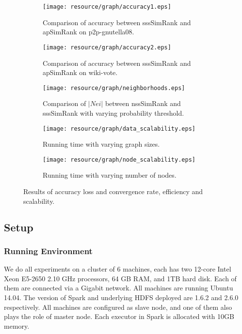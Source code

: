 \documentclass[conference]{IEEEtran}
\theoremstyle{definition}
\theoremstyle{definition}
\begin{document}
\begin{figure*}[t]
\centering
\begin{subfigure}[b]{0.32\textwidth}
	\center
	\texttt{[image: resource/graph/accuracy1.eps]}
	\caption{Comparison of accuracy   between sssSimRank and apSimRank on p2p-gnutella08.}
	\label{fig:three:a}
\end{subfigure}
\begin{subfigure}[b]{0.32\textwidth}
	\centering
	\texttt{[image: resource/graph/accuracy2.eps]}
	\caption{Comparison of accuracy   between sssSimRank and apSimRank on wiki-vote.}
	\label{fig:three:b}
\end{subfigure}
\begin{subfigure}[b]{0.32\textwidth}
	\centering
	\texttt{[image: resource/graph/neighborhoods.eps]}
	\caption{Comparison of $|Nei|$ between nssSimRank and sssSimRank with varying probability threshold.}
	\label{fig:three:c}
\end{subfigure}
\medskip
\begin{subfigure}[b]{0.32\textwidth}
	\centering
	\texttt{[image: resource/graph/data\_scalability.eps]}
	\caption{Running time with varying graph sizes.}
	\label{fig:three:d}
\end{subfigure}
\qquad
\begin{subfigure}[b]{0.32\textwidth}
	\center
	\texttt{[image: resource/graph/node\_scalability.eps]}
	\caption[width=\textwidth]{Running time with varying number of nodes.}
	\label{fig:three:e}
\end{subfigure}
\caption{Results of accuracy loss and convergence rate, efficiency and scalability.}
\label{fig:three}
\end{figure*}
\subsection {Setup}
\subsubsection{Running Environment}
We do all experiments on a cluster of 6 machines, each has two 12-core Intel Xeon E5-2650 2.10 GHz processors, 64 GB RAM, and 1TB hard disk. 
Each of them are connected via a Gigabit network.
All machines are running Ubuntu 14.04.
The version of Spark and underlying HDFS deployed are 1.6.2 and 2.6.0 respectively.
All machines are configured as slave node, and one of them also plays the role of master node.
Each executor in Spark is allocated with 10GB memory.
\end{document}
